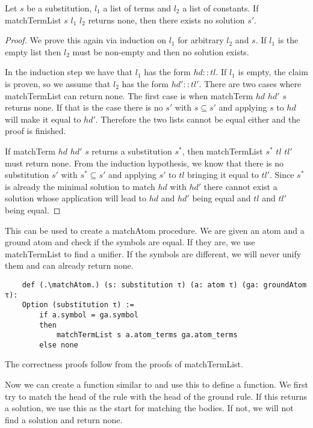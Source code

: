 \begin{lemma}[\matchTermListNoneImplNoSolution]
    Let $s$ be a substitution, $l_1$ a list of terms and $l_2$ a list of constants. If matchTermList $s$ $l_1$ $l_2$ returns none, then there exists no solution $s'$.
\end{lemma}
\begin{proof}
    We prove this again via induction on $l_1$ for arbitrary $l_2$ and $s$. If $l_1$ is the empty list then $l_2$ must be non-empty and then no solution exists.

    In the induction step we have that $l_1$ has the form $hd::tl$. If $l_1$ is empty, the claim is proven, so we assume that $l_2$ has the form $hd'::tl'$. There are two cases where matchTermList can return none. The first case is when matchTerm $hd$ $hd'$ $s$ returns none. If that is the case there is no $s'$ with $s\subseteq s'$ and applying $s$ to $hd$ will make it equal to $hd'$. Therefore the two lists cannot be equal either and the proof is finished.

    If matchTerm $hd$ $hd'$ $s$ returns a substitution $s^\ast$, then matchTermList $s^\ast$ $tl$ $tl'$ must return none. From the induction hypothesis, we know that there is no substitution $s'$ with $s^\ast \subseteq s'$ and applying $s'$ to $tl$ bringing it equal to $tl'$. Since $s^\ast$ is already the minimal solution to match $hd$ with $hd'$ there cannot exist a solution whose application will lead to $hd$ and $hd'$ being equal and $tl$ and $tl'$ being equal.
\end{proof}

This can be used to create a matchAtom procedure. We are given an atom and a ground atom and check if the symbols are equal. If they are, we use matchTermList to find a unifier.
If the symbols are different, we will never unify them and can already return none.

\begin{lstlisting}
    def (.\matchAtom.) (s: substitution τ) (a: atom τ) (ga: groundAtom τ):
    Option (substitution τ) :=
        if a.symbol = ga.symbol
        then
            matchTermList s a.atom_terms ga.atom_terms
        else none
\end{lstlisting}

The correctness proofs follow from the proofs of matchTermList.

Now we can create a \matchAtomList function similar to \matchTermList and use this to define a \matchRule function. We first try to match the head of the rule with the head of the ground rule. If this returns a solution, we use this as the start for matching the bodies. If not, we will not find a solution and return none.

